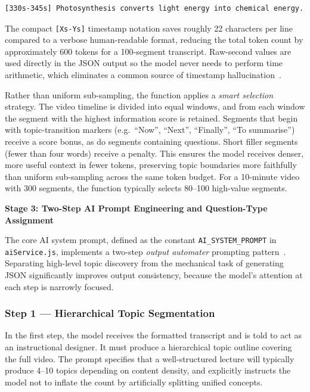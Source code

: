 \begin{verbatim}
[330s-345s] Photosynthesis converts light energy into chemical energy.
\end{verbatim}

The compact \texttt{[Xs-Ys]} timestamp notation saves roughly 22 characters per line compared to a verbose human-readable format, reducing the total token count by approximately 600 tokens for a 100-segment transcript. Raw-second values are used directly in the JSON output so the model never needs to perform time arithmetic, which eliminates a common source of timestamp hallucination~\cite{white2023}.

Rather than uniform sub-sampling, the function applies a \emph{smart selection} strategy. The video timeline is divided into equal windows, and from each window the segment with the highest information score is retained. Segments that begin with topic-transition markers (e.g.\ ``Now'', ``Next'', ``Finally'', ``To summarise'') receive a score bonus, as do segments containing questions. Short filler segments (fewer than four words) receive a penalty. This ensures the model receives denser, more useful context in fewer tokens, preserving topic boundaries more faithfully than uniform sub-sampling across the same token budget. For a 10-minute video with 300 segments, the function typically selects 80--100 high-value segments.

\textbf{Stage 3: Two-Step AI Prompt Engineering and Question-Type Assignment}

The core AI system prompt, defined as the constant \texttt{AI\_SYSTEM\_PROMPT} in \texttt{aiService.js}, implements a two-step \emph{output automater} prompting pattern~\cite{white2023}. Separating high-level topic discovery from the mechanical task of generating JSON significantly improves output consistency, because the model's attention at each step is narrowly focused.

\subsubsection{Step 1 --- Hierarchical Topic Segmentation}

In the first step, the model receives the formatted transcript and is told to act as an instructional designer. It must produce a hierarchical topic outline covering the full video. The prompt specifies that a well-structured lecture will typically produce 4--10 topics depending on content density, and explicitly instructs the model not to inflate the count by artificially splitting unified concepts.


